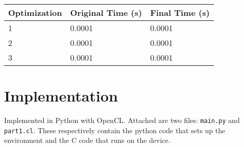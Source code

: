 \documentclass[12pt]{article}
\begin{document}
\begin{center}
    \begin{tabular}{ | l | l | l |}
	\hline
   	Optimization & Original Time (s) & Final Time (s) \\ \hline
    	1 & 0.0001 & 0.0001 \\ \hline
	2 & 0.0001 & 0.0001 \\ \hline
	3 & 0.0001 & 0.0001 \\  \hline
    \end{tabular}
\end{center}

\newpage
\section{ Implementation }

Implemented in Python with OpenCL. Attached are two files: \texttt{main.py} and \texttt{part1.cl}. These respectively contain the python code that sets up the environment and the C code that runs on the device.
 
% 
\end{document}

